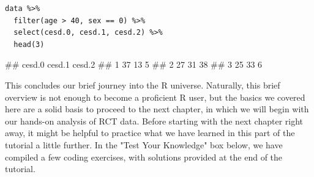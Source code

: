 \begin{lstlisting}
data %>%
  filter(age > 40, sex == 0) %>% 
  select(cesd.0, cesd.1, cesd.2) %>%
  head(3)
\end{lstlisting}
\begin{example}
##   cesd.0 cesd.1 cesd.2
## 1     37     13      5
## 2     27     31     38
## 3     25     33      6
\end{example}

This concludes our brief journey into the \textsf{R} universe. Naturally, this brief overview is not enough to become a proficient \textsf{R} user, but the basics we covered here are a solid basis to proceed to the next chapter, in which we will begin with our hands-on analysis of RCT data. Before starting with the next chapter right away, it might be helpful to practice what we have learned in this part of the tutorial a little further. In the "Test Your Knowledge" box below, we have compiled a few coding exercises, with solutions provided at the end of the tutorial. 

